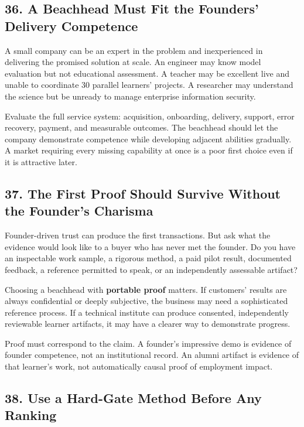 \subsection*{36. A Beachhead Must Fit the Founders' Delivery Competence}

A small company can be an expert in the problem and inexperienced in delivering the promised solution at scale. An engineer may know model evaluation but not educational assessment. A teacher may be excellent live and unable to coordinate 30 parallel learners' projects. A researcher may understand the science but be unready to manage enterprise information security.

Evaluate the full service system: acquisition, onboarding, delivery, support, error recovery, payment, and measurable outcomes. The beachhead should let the company demonstrate competence while developing adjacent abilities gradually. A market requiring every missing capability at once is a poor first choice even if it is attractive later.

\subsection*{37. The First Proof Should Survive Without the Founder's Charisma}

Founder-driven trust can produce the first transactions. But ask what the evidence would look like to a buyer who has never met the founder. Do you have an inspectable work sample, a rigorous method, a paid pilot result, documented feedback, a reference permitted to speak, or an independently assessable artifact?

Choosing a beachhead with \textbf{portable proof} matters. If customers' results are always confidential or deeply subjective, the business may need a sophisticated reference process. If a technical institute can produce consented, independently reviewable learner artifacts, it may have a clearer way to demonstrate progress.

Proof must correspond to the claim. A founder's impressive demo is evidence of founder competence, not an institutional record. An alumni artifact is evidence of that learner's work, not automatically causal proof of employment impact.

\subsection*{38. Use a Hard-Gate Method Before Any Ranking}

